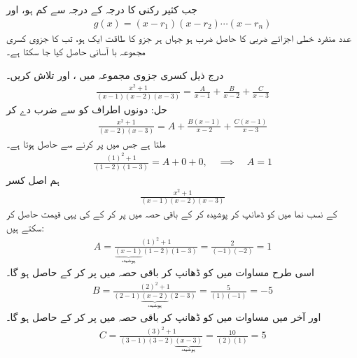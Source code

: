 جب کثیر رکنی  کا درجہ  کے درجہ سے کم ہو، اور
\begin{align*}
g(x)=(x-r_1)(x-r_2)\cdots(x-r_n)
\end{align*}
 عدد منفرد خطی اجزائے ضربی کا حاصل ضرب ہو جہاں ہر جزو کا طاقت ایک ہو، تب  کا جزوی کسری  مجموعہ با آسانی حاصل کیا جا سکتا ہے۔ 

درج ذیل کسری جزوی مجموعہ میں ،  اور  تلاش کریں۔
\begin{align}\label{مساوات_طریقہ_آسان_طریقہ_الف}
\frac{x^2+1}{(x-1)(x-2)(x-3)}=\frac{A}{x-1}+\frac{B}{x-2}+\frac{C}{x-3}
\end{align}
حل:\quad
دونوں اطراف کو  سے ضرب دے کر
\begin{align*}
\frac{x^2+1}{(x-2)(x-3)}=A+\frac{B(x-1)}{x-2}+\frac{C(x-1)}{x-3}
\end{align*}
ملتا ہے جس میں  پر کرنے سے  حاصل ہوتا ہے۔
\begin{align*}
\frac{(1)^2+1}{(1-2)(1-3)}=A+0+0,\quad\implies \quad A=1
\end{align*} 
ہم  اصل کسر
\begin{align*}
\frac{x^2+1}{(x-1)(x-2)(x-3)}
\end{align*}
کے نسب نما میں  کو ڈھانپ کر پوشیدہ کر کے  باقی حصہ میں  پر کر کے  کی یہی قیمت حاصل کر سکتے ہیں:
\begin{align*}
A=\frac{(1)^2+1}{\underbrace{\boxed{(x-1)}}_{\text{پوشیدہ}}(1-2)(1-3)} =\frac{2}{(-1)(-2)}=1
\end{align*}
اسی طرح مساوات میں  کو ڈھانپ کر باقی حصہ میں  پر کر کے  حاصل ہو گا۔
\begin{align*}
B=\frac{(2)^2+1}{(2-1)\underbrace{\boxed{(x-2)}}_{\text{پوشیدہ}}(2-3)} =\frac{5}{(1)(-1)}=-5
\end{align*}
اور آخر میں مساوات میں  کو ڈھانپ کر باقی حصہ میں  پر کر کے  حاصل ہو گا۔
\begin{align*}
C=\frac{(3)^2+1}{(3-1)(3-2)\underbrace{\boxed{(x-3)}}_{\text{پوشیدہ}}}=\frac{10}{(2)(1)}=5
\end{align*}

